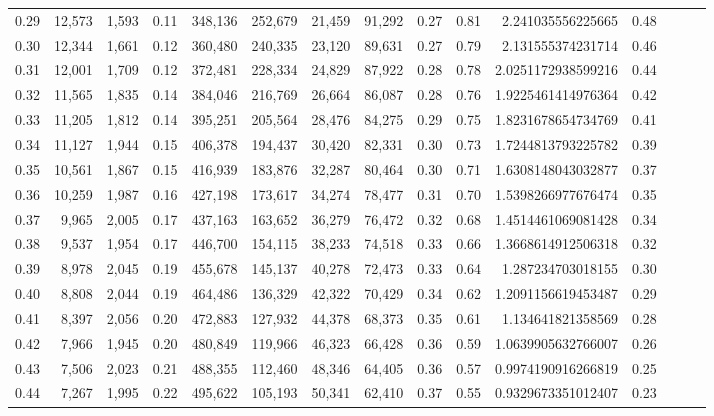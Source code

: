 \begin{tabular}{rrrrrrrrrrrrrrr}
0.29 &  12,573 &  1,593 &  0.11 &  348,136 &  252,679 &   21,459 &   91,292 &  0.27 &  0.81 &     2.241035556225665 &      0.48 \\
0.30 &  12,344 &  1,661 &  0.12 &  360,480 &  240,335 &   23,120 &   89,631 &  0.27 &  0.79 &     2.131555374231714 &      0.46 \\
0.31 &  12,001 &  1,709 &  0.12 &  372,481 &  228,334 &   24,829 &   87,922 &  0.28 &  0.78 &    2.0251172938599216 &      0.44 \\
0.32 &  11,565 &  1,835 &  0.14 &  384,046 &  216,769 &   26,664 &   86,087 &  0.28 &  0.76 &    1.9225461414976364 &      0.42 \\
0.33 &  11,205 &  1,812 &  0.14 &  395,251 &  205,564 &   28,476 &   84,275 &  0.29 &  0.75 &    1.8231678654734769 &      0.41 \\
0.34 &  11,127 &  1,944 &  0.15 &  406,378 &  194,437 &   30,420 &   82,331 &  0.30 &  0.73 &    1.7244813793225782 &      0.39 \\
0.35 &  10,561 &  1,867 &  0.15 &  416,939 &  183,876 &   32,287 &   80,464 &  0.30 &  0.71 &    1.6308148043032877 &      0.37 \\
0.36 &  10,259 &  1,987 &  0.16 &  427,198 &  173,617 &   34,274 &   78,477 &  0.31 &  0.70 &    1.5398266977676474 &      0.35 \\
0.37 &   9,965 &  2,005 &  0.17 &  437,163 &  163,652 &   36,279 &   76,472 &  0.32 &  0.68 &    1.4514461069081428 &      0.34 \\
0.38 &   9,537 &  1,954 &  0.17 &  446,700 &  154,115 &   38,233 &   74,518 &  0.33 &  0.66 &    1.3668614912506318 &      0.32 \\
0.39 &   8,978 &  2,045 &  0.19 &  455,678 &  145,137 &   40,278 &   72,473 &  0.33 &  0.64 &     1.287234703018155 &      0.30 \\
0.40 &   8,808 &  2,044 &  0.19 &  464,486 &  136,329 &   42,322 &   70,429 &  0.34 &  0.62 &    1.2091156619453487 &      0.29 \\
0.41 &   8,397 &  2,056 &  0.20 &  472,883 &  127,932 &   44,378 &   68,373 &  0.35 &  0.61 &     1.134641821358569 &      0.28 \\
0.42 &   7,966 &  1,945 &  0.20 &  480,849 &  119,966 &   46,323 &   66,428 &  0.36 &  0.59 &    1.0639905632766007 &      0.26 \\
0.43 &   7,506 &  2,023 &  0.21 &  488,355 &  112,460 &   48,346 &   64,405 &  0.36 &  0.57 &    0.9974190916266819 &      0.25 \\
0.44 &   7,267 &  1,995 &  0.22 &  495,622 &  105,193 &   50,341 &   62,410 &  0.37 &  0.55 &    0.9329673351012407 &      0.23 \\

\end{tabular}
